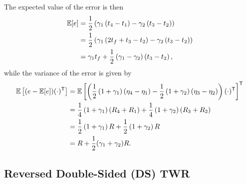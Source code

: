 \documentclass{decar-wsd}    %
\begin{document}
The expected value of the error is then
\begin{align}
    \mathbb{E} [e] &= \frac{1}{2} \left( \gamma_1 \left( t_4 - t_1 \right) - \gamma_2 \left( t_3 - t_2 \right) \right) \\
    &= \frac{1}{2} \left( \gamma_1 \left( 2t_f + t_3 - t_2 \right) - \gamma_2 \left( t_3 - t_2 \right) \right) \\
    &= \gamma_1 t_f + \frac{1}{2} \left(\gamma_1 - \gamma_2\right) \left( t_3 - t_2 \right),
\end{align}
while the variance of the error is given by
\begin{align}
    \mathbb{E} \left[ (e - \mathbb{E}[e])(\cdot)^{\mathsf{T}} \right] &= \mathbb{E} \left[ \left(\frac{1}{2} \left( 1 + \gamma_1\right) \left( \eta_4 - \eta_1 \right) - \frac{1}{2}\left( 1 + \gamma_2\right) \left( \eta_3 - \eta_2 \right) \right) (\cdot)^{\mathsf{T}} \right]^{\mathsf{T}} \\
    &= \frac{1}{4}\left( 1+\gamma_1 \right)\left( R_4 + R_1 \right) + \frac{1}{4} \left(1 + \gamma_2 \right) \left( R_3 + R_2 \right) \\
    &= \frac{1}{2}\left( 1+\gamma_1 \right) R + \frac{1}{2} \left(1 + \gamma_2 \right) R \\
    &= R + \frac{1}{2}(\gamma_1 + \gamma_2) R.
\end{align}

\subsection{Reversed Double-Sided (DS) TWR}
\end{document}
